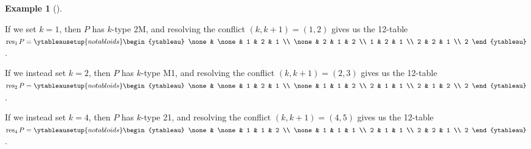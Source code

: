\documentclass[numbers=enddot,12pt,final,onecolumn,notitlepage]{scrartcl}%
\theoremstyle{definition}
\newtheorem{exmp}[theo]{Example}
\newenvironment{example}[1][]
{\begin{exmp}[#1]\begin{leftbar}}
{\end{leftbar}\end{exmp}}
\newenvironment{vershort}{}{}
\begin{document}
\begin{vershort}
\begin{example}
If we set $k=1$, then $P$ has $k$-type 2M, and resolving the conflict $\left(
k,k+1\right)  =\left(  1,2\right)  $ gives us the 12-table
$\operatorname*{res}\nolimits_{1}P=%
\ytableausetup{notabloids}
\begin{ytableau}
\none& \none& 1 & 2 & 1 \\
\none& 2 & 1 & 2 \\
1 & 2 & 1 \\
2 & 2 & 1 \\
2
\end{ytableau}%
$.

If we instead set $k=2$, then $P$ has $k$-type M1, and resolving the conflict
$\left(  k,k+1\right)  =\left(  2,3\right)  $ gives us the 12-table
$\operatorname*{res}\nolimits_{2}P=%
\ytableausetup{notabloids}
\begin{ytableau}
\none& \none& 1 & 2 & 1 \\
\none& 1 & 1 & 2 \\
2 & 1 & 1 \\
2 & 1 & 2 \\
2
\end{ytableau}%
$.

If we instead set $k=4$, then $P$ has $k$-type 21, and resolving the conflict
$\left(  k,k+1\right)  =\left(  4,5\right)  $ gives us the 12-table
$\operatorname*{res}\nolimits_{4}P=%
\ytableausetup{notabloids}
\begin{ytableau}
\none& \none& 1 & 1 & 2 \\
\none& 1 & 1 & 1 \\
2 & 1 & 1 \\
2 & 2 & 1 \\
2
\end{ytableau}%
$.


\end{example}
\end{vershort}
\end{document}
